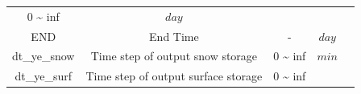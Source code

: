 \documentclass[]{scrbook}
\begin{document}
\begin{longtable}[]{@{}ccccc@{}}
\begin{minipage}[t]{0.10\columnwidth}
0 \textasciitilde{} inf\strut
\end{minipage} & \begin{minipage}[t]{0.10\columnwidth}\centering\strut
\(day\)\strut
\end{minipage} & \begin{minipage}[t]{0.26\columnwidth}\centering\strut
\strut
\end{minipage}\tabularnewline
\begin{minipage}[t]{0.17\columnwidth}\centering\strut
END\strut
\end{minipage} & \begin{minipage}[t]{0.23\columnwidth}\centering\strut
End Time\strut
\end{minipage} & \begin{minipage}[t]{0.10\columnwidth}\centering\strut
-\strut
\end{minipage} & \begin{minipage}[t]{0.10\columnwidth}\centering\strut
\(day\)\strut
\end{minipage} & \begin{minipage}[t]{0.26\columnwidth}\centering\strut
\strut
\end{minipage}\tabularnewline
\begin{minipage}[t]{0.17\columnwidth}\centering\strut
dt\_ye\_snow\strut
\end{minipage} & \begin{minipage}[t]{0.23\columnwidth}\centering\strut
Time step of output snow storage\strut
\end{minipage} & \begin{minipage}[t]{0.10\columnwidth}\centering\strut
0 \textasciitilde{} inf\strut
\end{minipage} & \begin{minipage}[t]{0.10\columnwidth}\centering\strut
\(min\)\strut
\end{minipage} & \begin{minipage}[t]{0.26\columnwidth}\centering\strut
\strut
\end{minipage}\tabularnewline
\begin{minipage}[t]{0.17\columnwidth}\centering\strut
dt\_ye\_surf\strut
\end{minipage} & \begin{minipage}[t]{0.23\columnwidth}\centering\strut
Time step of output surface storage\strut
\end{minipage} & \begin{minipage}[t]{0.10\columnwidth}\centering\strut
0 \textasciitilde{} inf\strut

\end{minipage}
\end{longtable}
\end{document}
